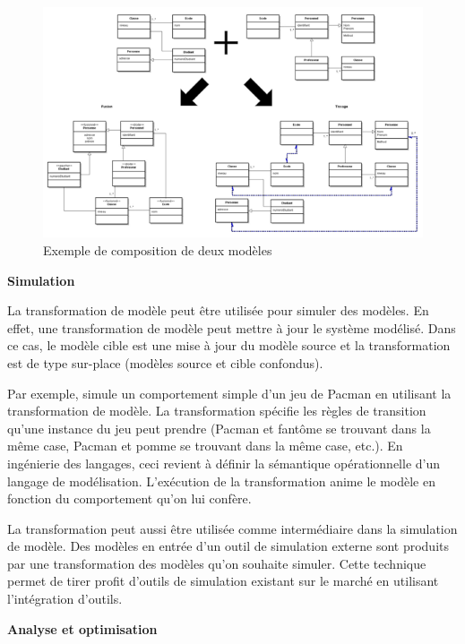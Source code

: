 \begin{description}
\begin{figure}[!htbp]
 \begin{center}
  \includegraphics[width=1\textwidth]{images/Chapitre1/compoExemple.png}
 \end{center}
 \caption{Exemple de composition de deux modèles}
 \label{fig:compoExemple}
\end{figure}

\item \textbf{Simulation}

La transformation de modèle peut être utilisée pour simuler des modèles. En 
effet, une transformation de modèle peut mettre à jour le système modélisé. Dans 
ce cas, le modèle cible est une mise à jour du modèle source et la 
transformation est de type sur-place (modèles source et cible confondus). 

Par exemple, \cite{syriani2011multi} simule un comportement simple d'un jeu de 
Pacman en utilisant la transformation de modèle. La transformation spécifie les 
règles de transition qu'une instance du jeu peut prendre (Pacman et fantôme se 
trouvant dans la même case, Pacman et pomme se trouvant dans la même case, 
etc.). En ingénierie des langages, ceci revient à définir la sémantique 
opérationnelle d'un langage de modélisation. L'exécution de la transformation 
anime le modèle en fonction du comportement qu'on lui confère.

La transformation peut aussi être utilisée comme intermédiaire dans la 
simulation de modèle. Des modèles en entrée d'un outil de simulation externe 
sont produits par une transformation des modèles qu'on souhaite simuler. Cette 
technique permet de tirer profit d'outils de simulation existant sur le marché 
en utilisant l'intégration d'outils.

\item \textbf{Analyse et optimisation}


\end{description}
